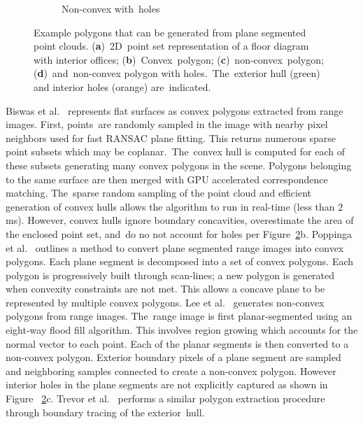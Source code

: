 \begin{figure}[H]
\begin{subfigure}{.24\linewidth}
    \caption{\label{fig:ch3_convex_concave_4}Non-convex with~holes}\vspace{6pt}
  \end{subfigure}
  \caption{Example polygons that can be generated from plane segmented point clouds. (\textbf{a})~2D~point set representation of a floor diagram with interior offices;  (\textbf{b})~Convex~polygon; (\textbf{c})~non-convex~polygon; (\textbf{d})~and~non-convex polygon with holes.~The~exterior hull (green) and interior holes (orange) are~indicated. }\label{fig:ch3_convex_concave}
\end{figure}


Biswas et al.~\cite{biswas_planar_2012} represents flat surfaces as convex polygons extracted from range images. First, points~are randomly sampled in the image with nearby pixel neighbors used for fast RANSAC plane fitting. This returns numerous sparse point subsets which may be coplanar.~The~convex hull is computed for each of these subsets generating many convex polygons in the scene. Polygons belonging to the same surface are then merged with GPU accelerated correspondence matching. The~sparse random sampling of the point cloud and efficient generation of convex hulls allows the algorithm to run in real-time (less than 2 ms). However, convex hulls ignore boundary concavities, overestimate the area of the enclosed point set, and~do no not account for holes per Figure~\ref{fig:ch3_convex_concave}b. Poppinga et al.~\cite{poppinga_fast_2008} outlines a  method to convert plane segmented range images into convex polygons. 
Each plane segment is decomposed into  a set of convex polygons. Each polygon is progressively built through scan-lines; a new polygon is generated when convexity constraints are not met. This allows a concave plane to be represented by multiple convex polygons. 
Lee et al.~\cite{lee_indoor_2012-1} generates non-convex polygons from range images. The~range image is first planar-segmented using an eight-way flood fill algorithm. This involves region growing which accounts for the normal vector to each point. Each of the planar segments is then converted to a non-convex polygon. Exterior boundary pixels of a plane segment are sampled and neighboring samples connected to create a non-convex polygon. However interior holes in the plane segments are not explicitly captured as shown in Figure ~\ref{fig:ch3_convex_concave}c. Trevor et al.~\cite{trevor2013efficient} performs a similar polygon extraction procedure through boundary tracing of the exterior~hull. 

